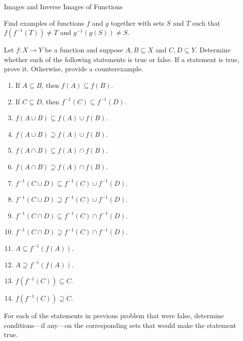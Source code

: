 \begin{section}{Images and Inverse Images of Functions}
\begin{problem}
Find examples of functions $f$ and $g$ together with sets $S$ and $T$ such that $f(f^{-1}(T))\neq T$ and $g^{-1}(g(S))\neq S$.
\end{problem}

\begin{problem}
Let $f:X\to Y$ be a function and suppose $A, B\subseteq X$ and $C, D\subseteq Y$. Determine whether each of the following statements is true or false. If a statement is true, prove it.  Otherwise, provide a counterexample.
\begin{enumerate}[label=\textrm{(\alph*)}]
\item If $A\subseteq B$, then $f(A)\subseteq f(B)$.
\item If $C\subseteq D$, then $f^{-1}(C)\subseteq f^{-1}(D)$.
\item $f(A\cup B)\subseteq f(A)\cup f(B)$.
\item $f(A\cup B)\supseteq f(A)\cup f(B)$.
\item $f(A\cap B)\subseteq f(A)\cap f(B)$.
\item $f(A\cap B)\supseteq f(A)\cap f(B)$.
\item $f^{-1}(C\cup D)\subseteq f^{-1}(C)\cup f^{-1}(D)$.
\item $f^{-1}(C\cup D)\supseteq f^{-1}(C)\cup f^{-1}(D)$.
\item $f^{-1}(C\cap D)\subseteq f^{-1}(C)\cap f^{-1}(D)$.
\item $f^{-1}(C\cap D)\supseteq f^{-1}(C)\cap f^{-1}(D)$.
\item $A\subseteq f^{-1}(f(A))$.
\item $A\supseteq f^{-1}(f(A))$.
\item $f(f^{-1}(C))\subseteq C$.
\item $f(f^{-1}(C))\supseteq C$.
\end{enumerate}
\end{problem}

\begin{problem}
For each of the statements in previous problem that were false, determine conditions---if any---on the corresponding sets that would make the statement true.
\end{problem}

\end{section}